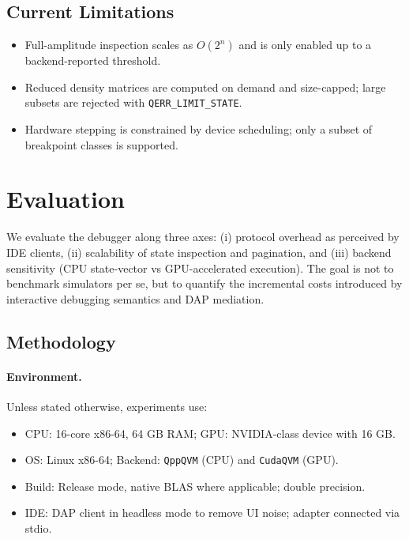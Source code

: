 \documentclass[12pt]{article}
\begin{document}
\begin{itemize}
\subsection{Current Limitations}

\begin{itemize}
  \item Full-amplitude inspection scales as \(O(2^n)\) and is only enabled up to a backend-reported threshold.
  \item Reduced density matrices are computed on demand and size-capped; large subsets are rejected with \texttt{QERR\_LIMIT\_STATE}.
  \item Hardware stepping is constrained by device scheduling; only a subset of breakpoint classes is supported.
\end{itemize}



\section{Evaluation}
\label{sec:evaluation}

We evaluate the debugger along three axes: (i) protocol overhead as perceived by IDE clients, (ii) scalability of state inspection and pagination, and (iii) backend sensitivity (CPU state-vector vs GPU-accelerated execution). The goal is not to benchmark simulators per se, but to quantify the incremental costs introduced by interactive debugging semantics and DAP mediation.

\subsection{Methodology}

\paragraph{Environment.}
Unless stated otherwise, experiments use:
\begin{itemize}
  \item CPU: 16-core x86-64, 64 GB RAM; GPU: NVIDIA-class device with 16 GB.
  \item OS: Linux x86-64; Backend: \texttt{QppQVM} (CPU) and \texttt{CudaQVM} (GPU).
  \item Build: Release mode, native BLAS where applicable; double precision.
  \item IDE: DAP client in headless mode to remove UI noise; adapter connected via stdio.
\end{itemize}


\end{itemize}
\end{document}

